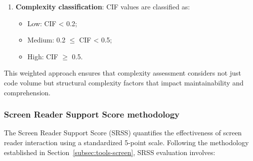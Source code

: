 \begin{enumerate}
    \item \textbf{Complexity classification}: CIF values are classified as:
    \begin{itemize}
        \item Low: CIF < 0.2;
        \item Medium: 0.2 $\leq$ CIF < 0.5;
        \item High: CIF $\geq$ 0.5.
    \end{itemize}
\end{enumerate}

This weighted approach ensures that complexity assessment considers not just code volume but structural complexity factors that impact maintainability and comprehension.

\subsubsection{Screen Reader Support Score methodology}
\label{subsubsec:srss-methodology}

The Screen Reader Support Score (SRSS) quantifies the effectiveness of screen reader interaction using a standardized 5-point scale. Following the methodology established in Section~\ref{subsec:tools-screen}, SRSS evaluation involves:

